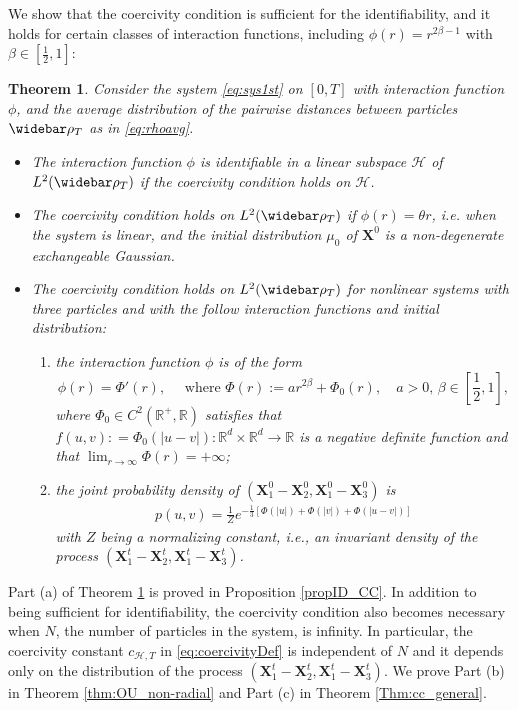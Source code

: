 \documentclass[]{elsarticle}
\def\R{\mathbb{R}}
\newcommand{\wbar}\widebar
\newcommand{\mbf}[1]{\boldsymbol{#1}}
\newcommand{\bX}{\mbf{X}}
\newcommand{\hypspace}{\mathcal{H}}
\newtheorem{theorem}{Theorem}
\numberwithin{equation}{section}
\numberwithin{theorem}{section}
\begin{document}
We show that the coercivity condition is sufficient for the identifiability, and it holds for certain classes of interaction functions,  including $\phi(r) = r^{2\beta-1}$ with $\beta \in [\frac{1}{2},1]$:
\begin{theorem}\label{thm_mainAll}
Consider the system  \eqref{eq:sys1st} on $[0,T]$ with interaction function $\phi$, and the average distribution of the pairwise distances between particles $\wbar \rho_T$ as in \eqref{eq:rhoavg}. 
\begin{itemize}
\item[(a).] The interaction function $\phi$ is identifiable in a linear subspace $\hypspace$ of $L^2(\wbar\rho_T)$ if the coercivity condition holds on $\hypspace$. 
\item[(b).] The coercivity condition holds on $L^2(\wbar\rho_T)$ if $\phi(r) = \theta r$, i.e. when the system is linear, and the initial distribution $\mu_0$ of $\bX^0$ is a non-degenerate exchangeable Gaussian.  
\item[(c).] The coercivity condition holds on $L^2(\wbar\rho_T)$ for nonlinear systems with three particles and with the follow interaction functions and initial distribution: 
\begin{enumerate}
 \item the interaction function $\phi$ is of the form
\begin{equation}\label{eq:Phi_nonlinear}
\phi(r) = \Phi'(r), \quad \text{ where } \Phi(r) :=  ar^{2\beta} + \Phi_0(r), \quad a>0,\, \beta \in[\frac{1}{2},1], 
\end{equation}
where $\Phi_0 \in C^2(\R^+,\R)$ satisfies that $f(u,v): =\Phi_0(|u-v|): \R^d\times \R^d\to \R$ is a negative definite function and that $\lim_{r\to \infty}\Phi(r)=+\infty$;
    \item the joint probability density of $(\bX^0_1-\bX^0_2,\bX^0_1-\bX^0_3)$ is 
\begin{align}\label{eq:r_invPDF}
p(u,v) = \frac{1}{Z} e^{-\frac{1}{3}\left[\Phi(|u|) + \Phi(|v|) + \Phi(|u-v|)\right] } 
\end{align}
 with $Z$ being a normalizing constant, i.e., an invariant density of the process $(\bX^t_1-\bX^t_2,\bX^t_1-\bX^t_3)$.   
\end{enumerate}  
\end{itemize} 
\end{theorem}
 
Part (a) of Theorem \ref{thm_mainAll} is proved in Proposition \ref{propID_CC}. In addition to being sufficient for identifiability, the coercivity condition also becomes necessary when $N$, the number of particles in the system, is infinity. In particular, the coercivity constant $c_{\hypspace, T}$ in \eqref{eq:coercivityDef} is independent of $N$ and it depends only on the distribution of the process $(\bX^t_1-\bX^t_2,\bX^t_1-\bX^t_3)$. We prove Part (b) in Theorem \ref{thm:OU_non-radial} and Part (c) in Theorem \ref{Thm:cc_general}. 
 
\end{document}
